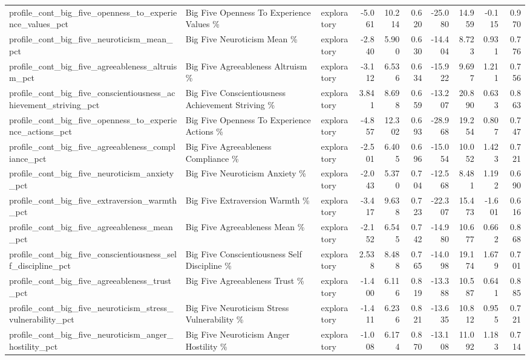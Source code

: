 \begin{table}[htbp]
{\begin{tabular}{lllrrrrrrr}
profile\_cont\_big\_five\_openness\_to\_experience\_values\_pct & Big Five Openness To Experience Values \% & exploratory & -5.061 & 10.214 & 0.620 & -25.080 & 14.959 & -0.115 & 0.970 \\
profile\_cont\_big\_five\_neuroticism\_mean\_pct & Big Five Neuroticism Mean \% & exploratory & -2.840 & 5.900 & 0.630 & -14.404 & 8.723 & 0.931 & 0.776 \\
profile\_cont\_big\_five\_agreeableness\_altruism\_pct & Big Five Agreeableness Altruism \% & exploratory & -3.112 & 6.536 & 0.634 & -15.922 & 9.697 & 1.211 & 0.756 \\
profile\_cont\_big\_five\_conscientiousness\_achievement\_striving\_pct & Big Five Conscientiousness Achievement Striving \% & exploratory & 3.841 & 8.698 & 0.659 & -13.207 & 20.890 & 0.633 & 0.863 \\
profile\_cont\_big\_five\_openness\_to\_experience\_actions\_pct & Big Five Openness To Experience Actions \% & exploratory & -4.857 & 12.302 & 0.693 & -28.968 & 19.254 & 0.807 & 0.747 \\
profile\_cont\_big\_five\_agreeableness\_compliance\_pct & Big Five Agreeableness Compliance \% & exploratory & -2.501 & 6.405 & 0.696 & -15.054 & 10.052 & 1.423 & 0.721 \\
profile\_cont\_big\_five\_neuroticism\_anxiety\_pct & Big Five Neuroticism Anxiety \% & exploratory & -2.043 & 5.370 & 0.704 & -12.568 & 8.481 & 1.192 & 0.690 \\
profile\_cont\_big\_five\_extraversion\_warmth\_pct & Big Five Extraversion Warmth \% & exploratory & -3.417 & 9.638 & 0.723 & -22.307 & 15.473 & -1.601 & 0.616 \\
profile\_cont\_big\_five\_agreeableness\_mean\_pct & Big Five Agreeableness Mean \% & exploratory & -2.152 & 6.545 & 0.742 & -14.980 & 10.677 & 0.662 & 0.868 \\
profile\_cont\_big\_five\_conscientiousness\_self\_discipline\_pct & Big Five Conscientiousness Self Discipline \% & exploratory & 2.538 & 8.488 & 0.765 & -14.098 & 19.174 & 1.679 & 0.701 \\
profile\_cont\_big\_five\_agreeableness\_trust\_pct & Big Five Agreeableness Trust \% & exploratory & -1.400 & 6.116 & 0.819 & -13.388 & 10.587 & 0.641 & 0.885 \\
profile\_cont\_big\_five\_neuroticism\_stress\_vulnerability\_pct & Big Five Neuroticism Stress Vulnerability \% & exploratory & -1.411 & 6.236 & 0.821 & -13.635 & 10.812 & 0.955 & 0.721 \\
profile\_cont\_big\_five\_neuroticism\_anger\_hostility\_pct & Big Five Neuroticism Anger Hostility \% & exploratory & -1.008 & 6.174 & 0.870 & -13.108 & 11.092 & 1.183 & 0.714 \\

\end{tabular}}
\end{table}
